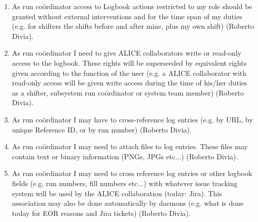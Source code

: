 \documentclass[a4paper,11pt]{book}
\begin{document}
\begin{enumerate}
  \item As run co\"ordinator access to Logbook actions restricted to my role should be granted without external interventions and for the time span of my duties (e.g. for shifters the shifts before and after mine, plus my own shift) (Roberto Divia).
  \item As run co\"ordinator I need to give ALICE collaborators write or read-only access to the logbook. These rights will be superseeded by equivalent rights given according to the function of the user (e.g. a ALICE collaborator with read-only access will be given write access during the time of his/her duties as a shifter, subsystem run co\"ordinator or system team member) (Roberto Divia).
  \item As run co\"ordinator I may have to cross-reference log entries (e.g. by URL, by unique Reference ID, or by run number)  (Roberto Divia).
  \item  As run co\"ordinator I may need to attach files to log entries. These files may contain text or binary information (PNGs, JPGs etc...) (Roberto Divia).
  \item As run co\"ordinator I may need to cross reference log entries or other logbook fields (e.g. run numbers, fill numbers etc...) with whatever issue tracking system will be used by the ALICE collaboration (today: Jira). This association may also be done automatically by daemons (e.g. what is done today for EOR reasons and Jira tickets) (Roberto Divia).
\end{enumerate}
\end{document}
